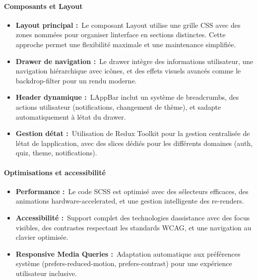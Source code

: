 \documentclass[12pt,a4paper,twoside]{report}
\begin{document}
\hypertarget{composants-et-layout}{%
\paragraph{Composants et Layout}\label{composants-et-layout}}

\begin{itemize}
\item
  \textbf{Layout principal :}~Le composant Layout utilise une grille CSS
  avec des zones nommées pour organiser l\textquotesingle interface en
  sections distinctes. Cette approche permet une flexibilité maximale et
  une maintenance simplifiée.
\item
  \textbf{Drawer de navigation :}~Le drawer intègre des informations
  utilisateur, une navigation hiérarchique avec icônes, et des effets
  visuels avancés comme le backdrop-filter pour un rendu moderne.
\item
  \textbf{Header dynamique :}~L\textquotesingle AppBar inclut un système
  de breadcrumbs, des actions utilisateur (notifications, changement de
  thème), et s\textquotesingle adapte automatiquement à
  l\textquotesingle état du drawer.
\item
  \textbf{Gestion d\textquotesingle état :}~Utilisation de Redux Toolkit
  pour la gestion centralisée de l\textquotesingle état de
  l\textquotesingle application, avec des slices dédiés pour les
  différents domaines (auth, quiz, theme, notifications).
\end{itemize}

\hypertarget{optimisations-et-accessibilituxe9}{%
\paragraph{Optimisations et
accessibilité}\label{optimisations-et-accessibilituxe9}}

\begin{itemize}
\item
  \textbf{Performance :}~Le code SCSS est optimisé avec des sélecteurs
  efficaces, des animations hardware-accelerated, et une gestion
  intelligente des re-renders.
\item
  \textbf{Accessibilité :}~Support complet des technologies
  d\textquotesingle assistance avec des focus visibles, des contrastes
  respectant les standards WCAG, et une navigation au clavier optimisée.
\item
  \textbf{Responsive Media Queries :}~Adaptation automatique aux
  préférences système (prefers-reduced-motion, prefers-contrast) pour
  une expérience utilisateur inclusive.
\end{itemize}
\end{document}
